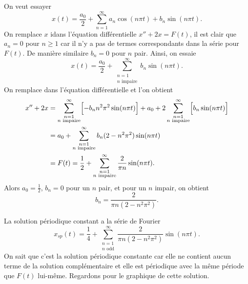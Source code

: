 \begin{example}
On veut essayer
\begin{equation*}
x(t) = \frac{a_0}{2} + \sum_{n=1}^\infty
a_n \cos (n \pi t) +
b_n \sin (n \pi t) .
\end{equation*}
On remplace $x$ idans l'équation différentielle $x''+2x = F(t)$,
il est clair que $a_n = 0$ pour $n \geq 1$ car il n'y a pas de termes correspondants
dans la série pour
$F(t)$.  De manière similaire $b_n = 0$ pour $n$ pair.  Ainsi, on essaie
\begin{equation*}
x(t) = \frac{a_0}{2} +
\sum_{\substack{n=1 \\ n \text{ impaire}}}^\infty
b_n \sin (n \pi t) .
\end{equation*}
On remplace dans l'équation différentielle et l'on obtient 
\begin{equation*}
\begin{split}
x'' + 2 x & =
\sum_{\substack{n=1 \\ n \text{ impaire}}}^\infty
\Bigl[ - b_n n^2 \pi^2 \sin (n \pi t) \Bigr] + 
a_0 +
2
\sum_{\substack{n=1 \\ n \text{ impaire}}}^\infty
\Bigl[ b_n \sin (n \pi t) \Bigr]
\\
& =
a_0 +
\sum_{\substack{n=1 \\ n \text{ impaire}}}^\infty
b_n (2 - n^2 \pi^2 ) \sin (n \pi t)
\\
& =
F(t) = \frac{1}{2} + \sum_{\substack{n=1 \\ n \text{ impaire}}}^\infty
\frac{2}{\pi n} \sin (n \pi t) .
\end{split}
\end{equation*}
Alors $a_0 = \frac{1}{2}$, $b_n = 0$ pour un $n$ pair, et pour un $n$ impair, on obtient 
\begin{equation*}
b_n = 
\frac{2}{\pi n (2 - n^2 \pi^2 )} .
\end{equation*}

La solution périodique constant a la série de Fourier
\begin{equation*}
x_{sp}(t) = \frac{1}{4} + \sum_{\substack{n=1 \\ n \text{ odd}}}^\infty
\frac{2}{\pi n (2 - n^2 \pi^2 )}
\sin (n \pi t) .
\end{equation*}
On sait que c'est la solution périodique constante car elle ne contient aucun terme
de la solution complémentaire et elle est périodique avec la même période que
$ F (t) $ lui-même. Regardons  pour le graphique de cette solution.
\begin{myfig}
\capstart
{}
\caption{Graphe de la fonction périodique constante  $x_{sp}$, de l' 
.%
\label{afs:steadyexfig}}
\end{myfig}
\end{example}

